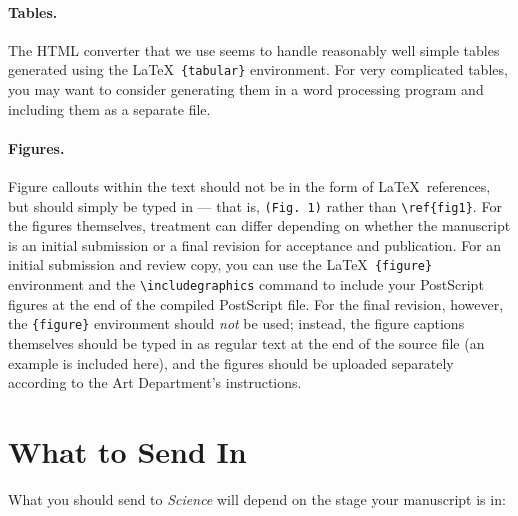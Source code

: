 \documentclass[10pt]{article}
\begin{document}
\paragraph*{Tables.}  The HTML converter that we use seems to handle
reasonably well simple tables generated using the \LaTeX\
\texttt{\{tabular\}} environment.  For very complicated tables, you
may want to consider generating them in a word processing program and
including them as a separate file.

\paragraph*{Figures.}  Figure callouts within the text should not be
in the form of \LaTeX\ references, but should simply be typed in ---
that is, \verb+(Fig. 1)+ rather than \verb+\ref{fig1}+.  For the
figures themselves, treatment can differ depending on whether the
manuscript is an initial submission or a final revision for acceptance
and publication.  For an initial submission and review copy, you can
use the \LaTeX\ \verb+{figure}+ environment and the
\verb+\includegraphics+ command to include your PostScript figures at
the end of the compiled PostScript file.  For the final revision,
however, the \verb+{figure}+ environment should {\it not\/} be used;
instead, the figure captions themselves should be typed in as regular
text at the end of the source file (an example is included here), and
the figures should be uploaded separately according to the Art
Department's instructions.


\section*{What to Send In}

What you should send to {\it Science\/} will depend on the stage your manuscript is in:
\end{document}

